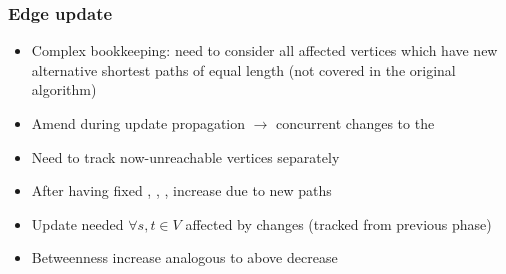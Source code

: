 \begin{frame}
  \frametitle{Edge update}

  \begin{itemize}
    \item Complex bookkeeping: need to consider all affected vertices which have new alternative shortest paths of equal length (not covered in the original algorithm)
    \item Amend \pred during update propagation $\rightarrow$ concurrent changes to the \spdag
    \item Need to track now-unreachable vertices separately
  \end{itemize}

  \begin{itemize}
    \item After having fixed \dist, \paths, \betw, increase \betw due to new paths
    \item Update needed $\forall s,t \in V$ affected by changes (tracked from previous phase)
    \item Betweenness increase analogous to above decrease
  \end{itemize}
\end{frame}


